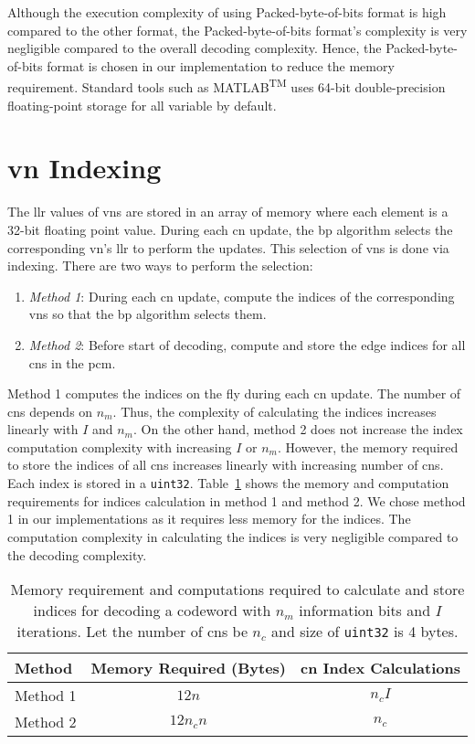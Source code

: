 Although the execution complexity of using Packed-byte-of-bits format is high compared to the other format, the Packed-byte-of-bits format's complexity is very negligible compared to the overall decoding complexity. Hence, the Packed-byte-of-bits format is chosen in our implementation to reduce the memory requirement. Standard tools such as MATLAB\textsuperscript{TM} uses 64-bit double-precision floating-point storage for all variable by default.

\section{\acrlong{vn} Indexing}
The \gls{llr} values of \glspl{vn} are stored in an array of memory where each element is a 32-bit floating point value. During each \gls{cn} update, the \gls{bp} algorithm selects the corresponding \gls{vn}'s \gls{llr} to perform the updates. This selection of \glspl{vn} is done via indexing. There are two ways to perform the selection:
\begin{enumerate}
  \item \emph{Method 1}: During each \gls{cn} update, compute the indices of the corresponding \glspl{vn} so that the \gls{bp} algorithm selects them.
  \item \emph{Method 2}: Before start of decoding, compute and store the edge indices for all \glspl{cn} in the \gls{pcm}.
\end{enumerate}

Method 1 computes the indices on the fly during each \gls{cn} update. The number of \glspl{cn} depends on $n_m$. Thus, the complexity of calculating the indices increases linearly with $I$ and $n_m$. On the other hand, method 2 does not increase the index computation complexity with increasing $I$ or $n_m$. However, the memory required to store the indices of all \glspl{cn} increases linearly with increasing number of \glspl{cn}. Each index is stored in a \texttt{uint32}. Table~\ref{tab:idx_com} shows the memory and computation requirements for indices calculation in method 1 and method 2. We chose method 1 in our implementations as it requires less memory for the indices. The computation complexity in calculating the indices is very negligible compared to the decoding complexity.
\begin{table}[htbp]
  \centering
  \begin{tabular}{|l|c|c|}
    \hline
    \textbf{Method} &\textbf{Memory Required (Bytes)} &\textbf{\gls{cn} Index Calculations}\\
    \hline
    \hline
    Method 1 &$12n$ &$n_c I$\\
    \hline
    Method 2 &$12n_cn$ &$n_c$\\
    \hline
  \end{tabular}
  \caption[Memory and complexity of different \acrshort{vn} indexing technieqes.]{Memory requirement and computations required to calculate and store indices for decoding a codeword with $n_m$ information bits and $I$ iterations. Let the number of \glspl{cn} be $n_c$ and size of \texttt{uint32} is 4 bytes.}
  \label{tab:idx_com}
\end{table}
 